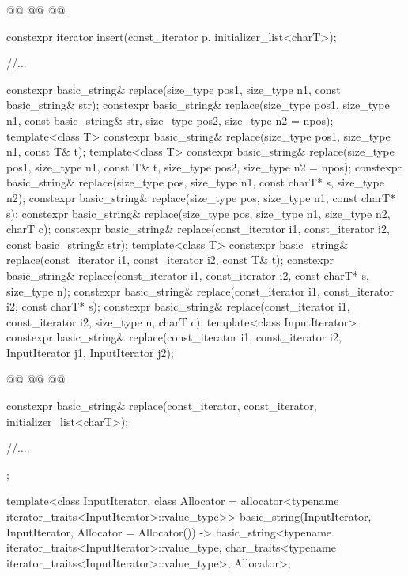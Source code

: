 \documentclass{wg21}
\begin{document}
\begin{codeblock}
{{        @@
        @@
        @@

        constexpr iterator insert(const_iterator p, initializer_list<charT>);

        //...

        constexpr basic_string& replace(size_type pos1, size_type n1, const basic_string& str);
        constexpr basic_string& replace(size_type pos1, size_type n1, const basic_string& str,
        size_type pos2, size_type n2 = npos);
        template<class T>
        constexpr basic_string& replace(size_type pos1, size_type n1, const T& t);
        template<class T>
        constexpr basic_string& replace(size_type pos1, size_type n1, const T& t,
        size_type pos2, size_type n2 = npos);
        constexpr basic_string& replace(size_type pos, size_type n1, const charT* s, size_type n2);
        constexpr basic_string& replace(size_type pos, size_type n1, const charT* s);
        constexpr basic_string& replace(size_type pos, size_type n1, size_type n2, charT c);
        constexpr basic_string& replace(const_iterator i1, const_iterator i2,
        const basic_string& str);
        template<class T>
        constexpr basic_string& replace(const_iterator i1, const_iterator i2, const T& t);
        constexpr basic_string& replace(const_iterator i1, const_iterator i2, const charT* s,
        size_type n);
        constexpr basic_string& replace(const_iterator i1, const_iterator i2, const charT* s);
        constexpr basic_string& replace(const_iterator i1, const_iterator i2, size_type n, charT c);
        template<class InputIterator>
        constexpr basic_string& replace(const_iterator i1, const_iterator i2,
            InputIterator j1, InputIterator j2);

        @@
        @@
        @@

        constexpr basic_string& replace(const_iterator, const_iterator, initializer_list<charT>);

        //....
    };

    template<class InputIterator,
    class Allocator = allocator<typename iterator_traits<InputIterator>::value_type>>
    basic_string(InputIterator, InputIterator, Allocator = Allocator())
    -> basic_string<typename iterator_traits<InputIterator>::value_type,
    char_traits<typename iterator_traits<InputIterator>::value_type>,
    Allocator>;


}
\end{codeblock}
\end{document}
